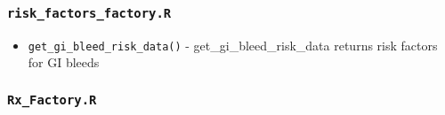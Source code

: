 \documentclass[
]{book}
\providecommand{\tightlist}{%
  \setlength{\itemsep}{0pt}\setlength{\parskip}{0pt}}
\begin{document}
\hypertarget{risk_factors_factory.r}{%
\subsubsection{\texorpdfstring{\texttt{risk\_factors\_factory.R}}{risk\_factors\_factory.R}}\label{risk_factors_factory.r}}

\begin{itemize}
\tightlist
\item
  \texttt{get\_gi\_bleed\_risk\_data()} - get\_gi\_bleed\_risk\_data returns risk factors for GI bleeds
\end{itemize}

\hypertarget{rx_factory.r-1}{%
\subsubsection{\texorpdfstring{\texttt{Rx\_Factory.R}}{Rx\_Factory.R}}\label{rx_factory.r-1}}
\end{document}
